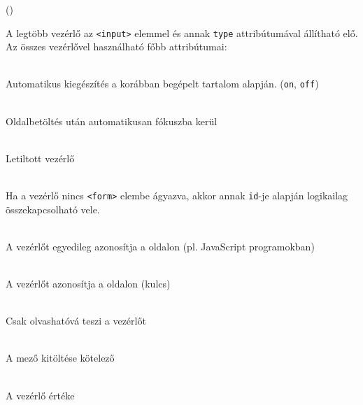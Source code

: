 \begin{frame}
  \begin{exampleblock}{ 
  ()}
    \footnotesize
    
  \end{exampleblock}
\end{frame}

\begin{frame}
  A legtöbb vezérlő az \texttt{<input>} elemmel és annak \texttt{type} 
  attribútumával állítható elő. Az összes vezérlővel használható főbb 
  attribútumai: 
  \begin{description}[m]
    \item[\texttt{autocomplete}] \hfill \\ Automatikus kiegészítés a 
    korábban begépelt tartalom alapján. (\texttt{on}, \texttt{off}) 
    \item[\texttt{autofocus}] \hfill \\ Oldalbetöltés után 
    automatikusan fókuszba kerül 
    \item[\texttt{disabled}] \hfill \\ Letiltott vezérlő 
    \item[\texttt{form}] \hfill \\ Ha a vezérlő 
    nincs \texttt{<form>} elembe ágyazva, akkor annak \texttt{id}-je 
    alapján logikailag összekapcsolható vele.
  \end{description}
\end{frame}

\begin{frame}
  \begin{description}[m]
    \item[\texttt{id}] \hfill \\ A vezérlőt egyedileg azonosítja a 
     oldalon (pl. JavaScript programokban)
    \item[\texttt{name}] \hfill \\ A vezérlőt azonosítja a 
     oldalon (kulcs) 
    \item[\texttt{readonly}] \hfill \\ Csak olvashatóvá teszi a vezérlőt 
    \item[\texttt{required}] \hfill \\ A mező kitöltése kötelező 
    \item[\texttt{value}] \hfill \\ A vezérlő értéke
  \end{description}
\end{frame}

